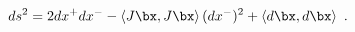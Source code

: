 \begin{equation*}
  ds^2 = 2 dx^+ dx^- - \left<J\bx,J\bx\right> (dx^-)^2 +
  \left<d\bx,d\bx\right>~.
\end{equation*}

